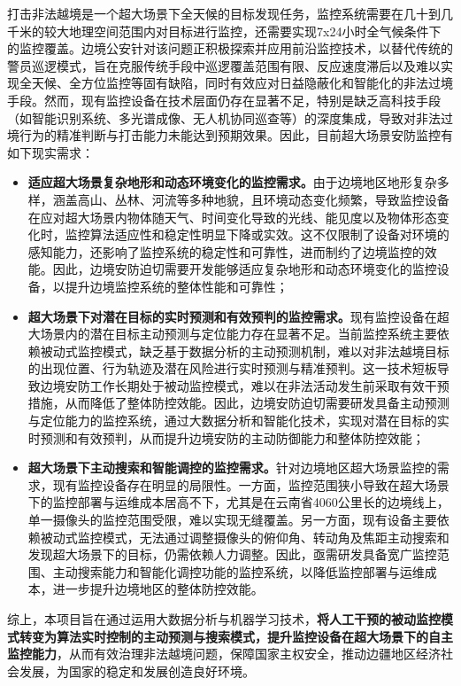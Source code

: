 打击非法越境是一个超大场景下全天候的目标发现任务，监控系统需要在几十到几千米的较大地理空间范围内对目标进行监控，还需要实现7x24小时全气候条件下的监控覆盖。边境公安针对该问题正积极探索并应用前沿监控技术，以替代传统的警员巡逻模式，旨在克服传统手段中巡逻覆盖范围有限、反应速度滞后以及难以实现全天候、全方位监控等固有缺陷，同时有效应对日益隐蔽化和智能化的非法过境手段。然而，现有监控设备在技术层面仍存在显著不足，特别是缺乏高科技手段（如智能识别系统、多光谱成像、无人机协同巡查等）的深度集成，导致对非法过境行为的精准判断与打击能力未能达到预期效果。因此，目前超大场景安防监控有如下现实需求：
\begin{itemize}[left=15pt,label={\textasteriskcentered}]
\item \textbf{适应超大场景复杂地形和动态环境变化的监控需求。}由于边境地区地形复杂多样，涵盖高山、丛林、河流等多种地貌，且环境动态变化频繁，导致监控设备在应对超大场景内物体随天气、时间变化导致的光线、能见度以及物体形态变化时，监控算法适应性和稳定性明显下降或实效。这不仅限制了设备对环境的感知能力，还影响了监控系统的稳定性和可靠性，进而制约了边境监控的效能。因此，边境安防迫切需要开发能够适应复杂地形和动态环境变化的监控设备，以提升边境监控系统的整体性能和可靠性；
\item \textbf{超大场景下对潜在目标的实时预测和有效预判的监控需求。}现有监控设备在超大场景内的潜在目标主动预测与定位能力存在显著不足。当前监控系统主要依赖被动式监控模式，缺乏基于数据分析的主动预测机制，难以对非法越境目标的出现位置、行为轨迹及潜在风险进行实时预测与精准预判。这一技术短板导致边境安防工作长期处于被动监控模式，难以在非法活动发生前采取有效干预措施，从而降低了整体防控效能。因此，边境安防迫切需要研发具备主动预测与定位能力的监控系统，通过大数据分析和智能化技术，实现对潜在目标的实时预测和有效预判，从而提升边境安防的主动防御能力和整体防控效能；
\item \textbf{超大场景下主动搜索和智能调控的监控需求。}针对边境地区超大场景监控的需求，现有监控设备存在明显的局限性。一方面，监控范围狭小导致在超大场景下的监控部署与运维成本居高不下，尤其是在云南省4060公里长的边境线上，单一摄像头的监控范围受限，难以实现无缝覆盖。另一方面，现有设备主要依赖被动式监控模式，无法通过调整摄像头的俯仰角、转动角及焦距主动搜索和发现超大场景下的目标，仍需依赖人力调整。因此，亟需研发具备宽广监控范围、主动搜索能力和智能化调控功能的监控系统，以降低监控部署与运维成本，进一步提升边境地区的整体防控效能。
\end{itemize}


综上，本项目旨在通过运用大数据分析与机器学习技术，\textbf{将人工干预的被动监控模式转变为算法实时控制的主动预测与搜索模式，提升监控设备在超大场景下的自主监控能力}，从而有效治理非法越境问题，保障国家主权安全，推动边疆地区经济社会发展，为国家的稳定和发展创造良好环境。


